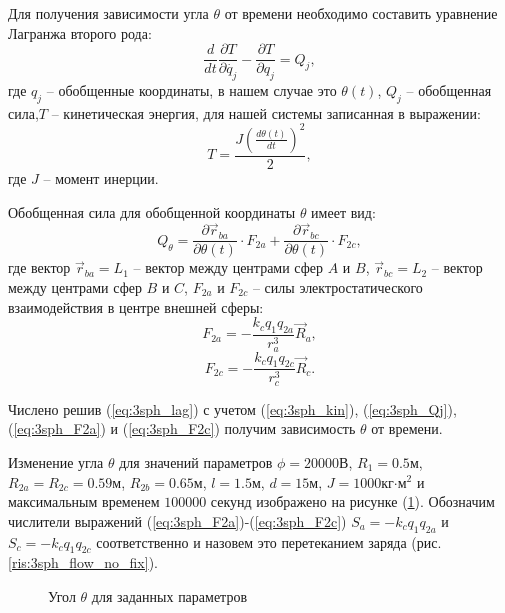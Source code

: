 Для получения зависимости угла $\theta$ от времени необходимо составить уравнение Лагранжа второго рода\cite{markeev}:
\begin{equation}
\label{eq:3sph_lag}
	\frac{d}{dt}\frac{\partial T}{\partial \dot{q_j}} - \frac{\partial T}{\partial q_j} = Q_j,
\end{equation}
где $q_j$ – обобщенные координаты, в нашем случае это $\theta(t)$, $Q_j$ – обобщенная сила,$T$ – кинетическая энергия, для нашей системы записанная в выражении:
\begin{equation}
\label{eq:3sph_kin}
	T = \frac{J \left(\frac{d \theta (t)}{dt}\right)^2}{2},
\end{equation}
где $J$ – момент инерции.

Обобщенная сила для обобщенной координаты $\theta$ имеет вид:
\begin{equation}
\label{eq:3sph_Qj}
	Q_\theta = \frac{\partial \vec{r}_{ba}}{\partial \theta(t)} \cdot F_{2a} + \frac{\partial \vec{r}_{bc}}{\partial \theta(t)} \cdot F_{2c},
\end{equation}
где вектор $\vec{r}_{ba} = L_1$ – вектор между центрами сфер $A$ и $B$, $\vec{r}_{bc} = L_2$ – вектор между центрами сфер $B$ и $C$, $F_{2a}$ и $F_{2c}$ – силы электростатического взаимодействия в центре внешней сферы:
\begin{equation}
\label{eq:3sph_F2a}
	F_{2a} = - \frac{k_c q_1 q_{2a}}{r_a^3} \vec{R}_a,
\end{equation}
\begin{equation}
\label{eq:3sph_F2c}
	F_{2c} = - \frac{k_c q_1 q_{2c}}{r_c^3} \vec{R}_c.
\end{equation}

Числено решив (\ref{eq:3sph_lag}) с учетом (\ref{eq:3sph_kin}), (\ref{eq:3sph_Qj}), (\ref{eq:3sph_F2a}) и (\ref{eq:3sph_F2c}) получим зависимость $\theta$ от времени.

Изменение угла $\theta$ для значений параметров $\phi = 20000$В, $R_1 = 0.5$м, $R_{2a} = R_{2c} = 0.59$м, $R_{2b} = 0.65$м, $l = 1.5$м, $d = 15$м, $J = 1000$кг$\cdot$м${}^2$ \cite{3sph} и максимальным временем $100000$ секунд изображено на рисунке (\ref{ris:3sph_theta_no_fix}).
Обозначим числители выражений (\ref{eq:3sph_F2a})-(\ref{eq:3sph_F2c}) $S_a = - k_c q_1 q_{2a}$ и $S_c = - k_c q_1 q_{2c}$ соответственно и назовем это перетеканием заряда (рис. \ref{ris:3sph_flow_no_fix}).

\begin{figure}[H]
	\center{\texttt{[image: msm\_theta\_d=15\_no\_fix.png]}}
	\caption{Угол $\theta$ для заданных параметров}
	\label{ris:3sph_theta_no_fix}
\end{figure}

